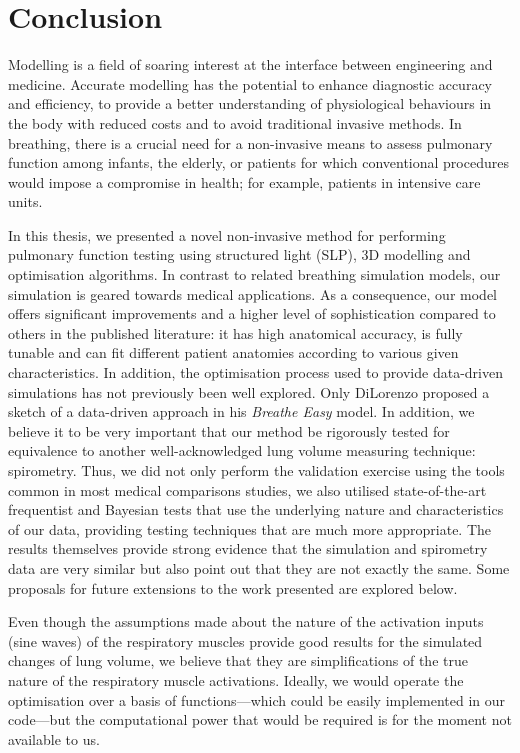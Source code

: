 \chapter*{Conclusion}

Modelling is a field of soaring interest at the interface between engineering and medicine. Accurate modelling has the potential to enhance diagnostic accuracy and efficiency, to provide a better understanding of physiological behaviours in the body with reduced costs and to avoid traditional invasive methods. In breathing, there is a crucial need for a non-invasive means to assess pulmonary function among infants, the elderly, or patients for which conventional procedures would impose a compromise in health; for example, patients in intensive care units. 

In this thesis, we presented a novel non-invasive method for performing pulmonary function testing using structured light (SLP), 3D modelling and optimisation algorithms. In contrast to related breathing simulation models, our simulation is geared towards medical applications. As a consequence, our model offers significant improvements and a higher level of sophistication compared to others in the published literature: it has high anatomical accuracy, is fully tunable and can fit different patient anatomies according to various given characteristics. In addition, the optimisation process used to provide data-driven simulations has not previously been well explored. Only DiLorenzo \cite{dilorenzo2009breathing} proposed a sketch of a data-driven approach in his \emph{Breathe Easy} model. In addition, we believe it to be very important that our method be rigorously tested for equivalence to another well-acknowledged lung volume measuring technique: spirometry. Thus, we did not only perform the validation exercise using the tools common in most medical comparisons studies, we also utilised state-of-the-art frequentist and Bayesian tests that use the underlying nature and characteristics of our data, providing testing techniques that are much more appropriate. The results themselves provide strong evidence that the simulation and spirometry data are very similar but also point out that they are not exactly the same. Some proposals for future extensions to the work presented are explored below.

Even though the assumptions made about the nature of the activation inputs (sine waves) of the respiratory muscles provide good results for the simulated changes of lung volume, we believe that they are simplifications of the true nature of the respiratory muscle activations. Ideally, we would operate the optimisation over a basis of functions---which could be easily implemented in our code---but the computational power that would be required is for the moment not available to us.


